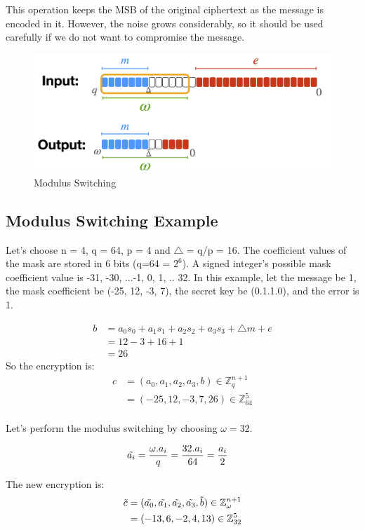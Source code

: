 \documentclass{techrep}
\theoremstyle{definition}
\theoremstyle{plain}
\newcommand{\Z}{\mathbb{Z}}
\begin{document}
This operation keeps the MSB of the original ciphertext as the message is encoded in it. However, the noise grows considerably, so it should be used carefully if we do not want to compromise the message.

	\begin{figure}[H]
		\centering
	\includegraphics[width=0.9\columnwidth]{fig/mod-switch.png}
		\caption{Modulus Switching}
		\label{fig:mod-switch}
	\end{figure}
\subsection{Modulus Switching Example}
Let’s choose n = 4, q = 64, p = 4 and $\bigtriangleup$ = q/p = 16. The coefficient values of the mask are stored in 6 bits (q=64 = $2^6$).  A signed integer's possible mask coefficient value is {-31, -30, ...-1, 0, 1, .. 32}.  In this example, let the message be 1, the mask coefficient be (-25, 12, -3, 7), the secret key be (0.1.1.0), and the error is 1.

	\begin{align*}
    b &= a_0s_0 + a_1s_1 + a_2s_2 + a_3s_3 + \bigtriangleup m + e \\
     &= 12- 3 + 16 + 1 \\
     &= 26
	\end{align*}
So the encryption is:
	\begin{align*}
    c &= (a_0, a_1, a_2, a_3, b) \in \Z_q^{n+1}\\
     &= (-25, 12, -3, 7, 26)  \in \Z_{64}^5\\
	\end{align*}

Let's perform the modulus switching by choosing $\omega = 32$.

	\begin{align*}
\Tilde{a_i}	&=	 \frac{\omega.a_i}{q} =  \frac{32.a_i}{64} =  \frac{a_i}{2}
	\end{align*}

The new encryption is:
	\begin{align*}
    \Tilde{c} &= (\Tilde{a_0}, \Tilde{a_1}, \Tilde{a_2}, \Tilde{a_3}, \Tilde{b}) \in \Z_\omega^{n+1}\\
     &= (-13, 6, -2, 4, 13)  \in \Z_{32}^5\\
	\end{align*}
\end{document}
